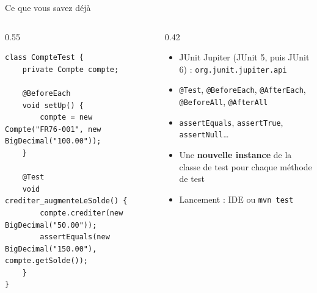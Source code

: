 \documentclass[aspectratio=169,10pt]{beamer}
\begin{document}
\begin{frame}[fragile]{Ce que vous savez déjà}
  \begin{columns}[T]
    \begin{column}{0.55\textwidth}
\begin{lstlisting}[basicstyle=\lstcode\scriptsize]
class CompteTest {
    private Compte compte;

    @BeforeEach
    void setUp() {
        compte = new Compte("FR76-001", new BigDecimal("100.00"));
    }

    @Test
    void crediter_augmenteLeSolde() {
        compte.crediter(new BigDecimal("50.00"));
        assertEquals(new BigDecimal("150.00"), compte.getSolde());
    }
}
\end{lstlisting}
    \end{column}
    \begin{column}{0.42\textwidth}
      \begin{itemize}
        \item JUnit Jupiter (JUnit 5, puis JUnit 6) : \texttt{org.junit.jupiter.api}
        \item \texttt{@Test}, \texttt{@BeforeEach}, \texttt{@AfterEach}, \texttt{@BeforeAll}, \texttt{@AfterAll}
        \item \texttt{assertEquals}, \texttt{assertTrue}, \texttt{assertNull}\ldots
        \item Une \textbf{nouvelle instance} de la classe de test pour chaque méthode de test
        \item Lancement : IDE ou \texttt{mvn test}
      \end{itemize}
    \end{column}
  \end{columns}
\end{frame}
\end{document}
